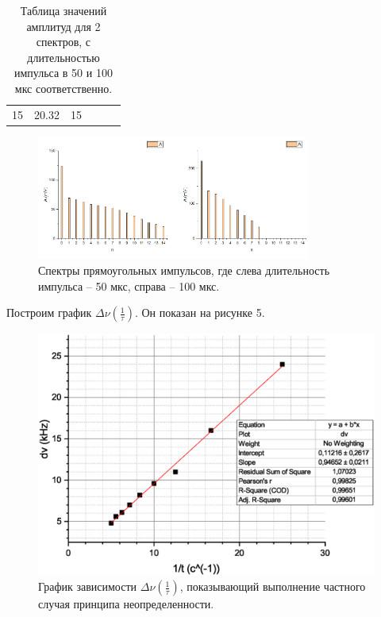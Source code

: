 \documentclass[a4paper, 14pt]{extarticle}%
\newcommand\ECaption[1]{%
     \captionsetup{font=footnotesize}%
     \caption{#1}}
\begin{document}
\begin{table}[h!]
\begin{center}
\begin{tabular}{|c|c|c|ccc}
\cellcolor[HTML]{9698ED}15 & \cellcolor[HTML]{9698ED}20.32 & \cellcolor[HTML]{9698ED}15    &                                                &                                                    &                                                       \\ \cline{1-3}
\end{tabular}
\ECaption{Таблица значений амплитуд для 2 спектров, с длительностью импульса в 50 и 100 мкс соответственно. }
\end{center}
\end{table}

\begin{figure}[h!]
\begin{center}
\includegraphics[width=0.8\textwidth]{speca}
\end{center}
\ECaption{Спектры прямоугольных импульсов, где слева длительность импульса -- 50 мкс, справа -- 100 мкс.}
\end{figure}

Построим график $\Delta\nu(\frac{1}{\tau})$. Он показан на рисунке 5.

\begin{figure}[h!]
\begin{center}
\includegraphics[width=1\textwidth]{grvt}
\end{center}
\ECaption{График зависимости $\Delta\nu(\frac{1}{\tau})$, показывающий выполнение частного случая принципа неопределенности.}
\end{figure}
\end{document}
